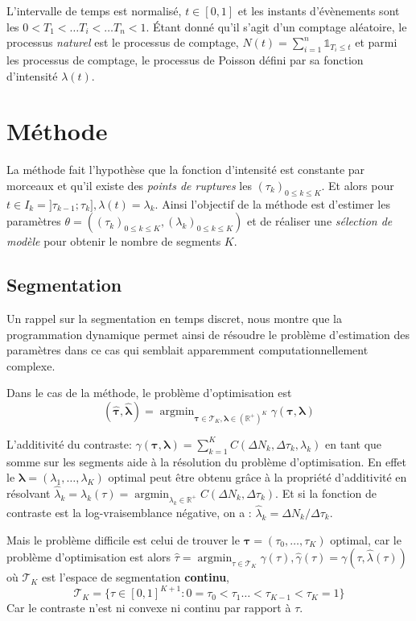 \documentclass[a4paper,10pt]{article}\usepackage[]{graphicx}\usepackage[]{xcolor}
\DeclareMathOperator*{\argmin}{argmin}
\newcommand{\R}{\mathbb{R}}
\newcommand{\segspace}{\mathcal{T}_K}
\begin{document}
L'intervalle de temps est normalisé, $t\in[0,1]$ et les instants d'évènements 
sont les $0<T_1<\dots T_i<\dots T_n < 1$.
Étant donné qu'il s'agit d'un comptage aléatoire, le processus \emph{naturel}
est le processus de comptage, $N(t) = \sum_{i=1}^n \mathds{1}_{T_i \leq t}$ et 
parmi les processus de comptage, le processus de Poisson défini par sa fonction d'intensité $\lambda(t)$.\\
\section{Méthode}

La méthode fait l'hypothèse que la fonction d'intensité est constante par 
morceaux et qu'il existe des \emph{points de ruptures} les $(\tau_k)_{0\leq k \leq K}$.
Et alors pour $t \in I_k = ] \tau_{k-1}; \tau_{k} ], \lambda(t) = \lambda_k$.
Ainsi l'objectif de la méthode est d'estimer les paramètres 
$\theta =((\tau_k)_{0\leq k \leq K}, (\lambda_k)_{0\leq k \leq K} )$ et de 
réaliser une \emph{sélection de modèle} pour obtenir le nombre de segments $K$.

\subsection{Segmentation}

Un rappel sur la segmentation en temps discret, nous montre que la programmation
dynamique permet ainsi de résoudre le problème d'estimation des paramètres dans 
ce cas qui semblait apparemment computationnellement complexe.

Dans le cas de la méthode, le problème d'optimisation est 
$$(\widehat{\bm{\tau}}, \widehat{\bm{\lambda}}) = 
\argmin_{\bm{\tau}\in\segspace, \bm{\lambda} \in (\R^+)^K} \gamma (\bm{\tau}, \bm{\lambda})$$

L'additivité du contraste: $\gamma(\bm\tau, \bm\lambda) = 
\sum_{k=1}^K C(\Delta N_k, \Delta\tau_k, \lambda_k)$ en tant que somme sur les 
segments aide à la résolution du problème d'optimisation.
En effet le $\bm \lambda = (\lambda_1, \dots, \lambda_K)$ optimal peut être obtenu grâce à la propriété d'additivité
en résolvant $\widehat \lambda_k = \lambda_k (\tau) = \argmin_{\lambda_k \in \R^+} 
C(\Delta N_k, \Delta\tau_k)$.
Et si la fonction de contraste est la log-vraisemblance négative, on a : 
$\widehat \lambda_k = \Delta N_k / \Delta \tau_k$.

Mais le problème difficile est celui de trouver le $\bm\tau = (\tau_0, \dots, 
\tau_K)$ optimal, car le problème 
d'optimisation est alors $\widehat \tau = 
\argmin_{\tau\in\segspace} \widehat \gamma(\tau), 
\widehat \gamma(\tau) = \gamma (\tau, \widehat \lambda (\tau))$ où $\segspace$ 
est l'espace de segmentation \textbf{continu}, $$\segspace = 
\bigl\{ \tau \in [0,1]^{K+1} : 0 = \tau_0 < \tau_1 \dots < \tau_{K-1} < 
\tau_K = 1 \bigr\}$$
Car le contraste n'est ni convexe ni continu par rapport à $\tau$.
\end{document}
